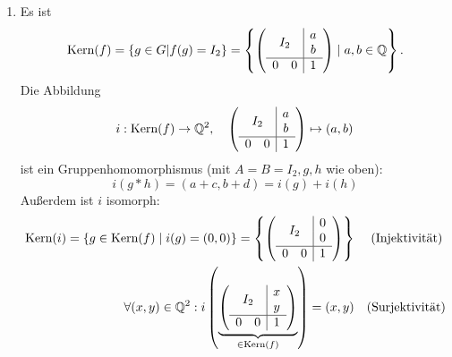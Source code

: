 \begin{enumerate}
	 \item Es ist
	 \begin{equation*}
	 	\text{Kern}(f) = \{ g \in G | f(g) = I_2 \} = \left \{ \left( 
				\begin{array}{cc|c}
					\multicolumn{2}{c|}{\multirow{2}{*}{\( I_2 \)}} & a \\
					\multicolumn{2}{c|}{} & b \\
					\hline 
					0 & 0 & 1
				\end{array}
			 \right) \mid a,b \in \Q \right \}\text{.}
	 \end{equation*}
	 Die Abbildung
	 \begin{equation*}
	 	i: \text{Kern}(f) \to \Q^2, \quad \left( 
				\begin{array}{cc|c}
					\multicolumn{2}{c|}{\multirow{2}{*}{\( I_2 \)}} & a \\
					\multicolumn{2}{c|}{} & b \\
					\hline 
					0 & 0 & 1
				\end{array}
			 \right) \mapsto (a,b)
	 \end{equation*}
	 ist ein Gruppenhomomorphismus (mit \( A = B = I_2, g, h \) wie oben):
	 \begin{equation*}
	 	i(g*h) = (a+c, b+d) = i(g) + i(h)
	 \end{equation*}
	 Außerdem ist \( i \) isomorph:
	 \begin{align*}
	 	\text{Kern}(i) = \{ g \in \text{Kern}(f) \mid i(g) = (0,0) \} = \left \{ \left( 
				\begin{array}{cc|c}
					\multicolumn{2}{c|}{\multirow{2}{*}{\( I_2 \)}} & 0 \\
					\multicolumn{2}{c|}{} & 0 \\
					\hline 
					0 & 0 & 1
				\end{array}
			 \right) \right \} &\quad \text{ (Injektivität)} \\
		\forall (x,y) \in \Q^2: i\left(\underbrace{\left( 
				\begin{array}{cc|c}
					\multicolumn{2}{c|}{\multirow{2}{*}{\( I_2 \)}} & x \\
					\multicolumn{2}{c|}{} & y \\
					\hline 
					0 & 0 & 1
				\end{array}
			 \right)}_{\in \text{Kern}(f)}\right) = (x,y) &\quad \text{(Surjektivität)}
	 \end{align*}
\end{enumerate}

\newpage



